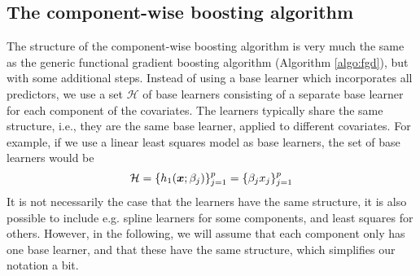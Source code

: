 \subsection{The component-wise boosting algorithm}
The structure of the component-wise boosting algorithm is very much the same as the generic functional gradient boosting algorithm (Algorithm \ref{algo:fgd}), but with some additional steps.
Instead of using a base learner which incorporates all predictors, we use a set $\mathcal{H}$ of base learners consisting of a separate base learner for each component of the covariates.
The learners typically share the same structure, i.e., they are the same base learner, applied to different covariates.
For example, if we use a linear least squares model as base learners, the set of base learners would be
\begin{equation*}
    \mathcal{H}=\{h_1(\bm{x};\beta_j)\}_{j=1}^p=\{\beta_j x_j\}_{j=1}^p
\end{equation*}
It is not necessarily the case that the learners have the same structure, it is also possible to include e.g. spline learners for some components, and least squares for others.
However, in the following, we will assume that each component only has one base learner, and that these have the same structure, which simplifies our notation a bit.

